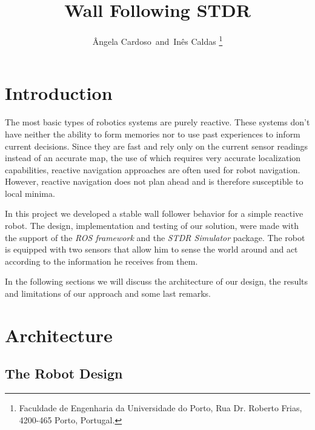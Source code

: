 \documentclass[10pt,journal,compsoc]{IEEEtran}
\begin{document}
\title{Wall Following STDR}
\author{\^{A}ngela Cardoso~and~In\^{e}s Caldas%
\thanks{Faculdade de Engenharia da Universidade do Porto, Rua Dr. Roberto Frias, 4200-465 Porto, Portugal.}}



\maketitle


\section{Introduction}
The most basic types of robotics systems are purely reactive. These systems don’t have neither the ability to form memories nor to use past experiences to inform current decisions. Since they are fast and rely only on the current sensor readings instead of an accurate map, the use of which requires very accurate localization capabilities, reactive navigation approaches are often used for robot navigation. However, reactive navigation does not plan ahead and is therefore susceptible to local minima. 

In this project we developed a stable wall follower behavior for a simple reactive robot. The design, implementation and testing of our solution, were made with the support of the \textit{ROS framework} and the \textit{STDR Simulator} package. The robot is equipped with two sensors that allow him to sense the world around and act according to the information he receives from them. 

In the following sections we will discuss the architecture of our design, the results and limitations of our approach and some last remarks.

\cite{example}

\section{Architecture}
\subsection{The Robot Design}
\end{document}
